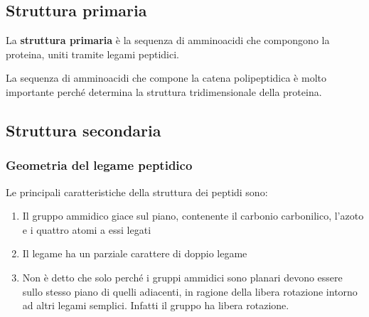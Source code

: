 \subsection{Struttura primaria}
La \textbf{struttura primaria} è la sequenza di amminoacidi che compongono la proteina, uniti tramite legami peptidici.

La sequenza di amminoacidi che compone la catena polipeptidica è molto importante perché determina la struttura tridimensionale della proteina.

\subsection{Struttura secondaria}
\subsubsection{Geometria del legame peptidico}
\noindent Le principali caratteristiche della struttura dei peptidi sono:
\begin{enumerate}
	\item Il gruppo ammidico giace sul piano, contenente il carbonio carbonilico, l'azoto e i quattro atomi a essi legati
	\item Il legame  ha un parziale carattere di doppio legame
	\item Non è detto che solo perché i gruppi ammidici sono planari devono essere sullo stesso piano di quelli adiacenti, in ragione della libera rotazione intorno ad altri legami semplici. Infatti il gruppo  ha libera rotazione.
\end{enumerate}

